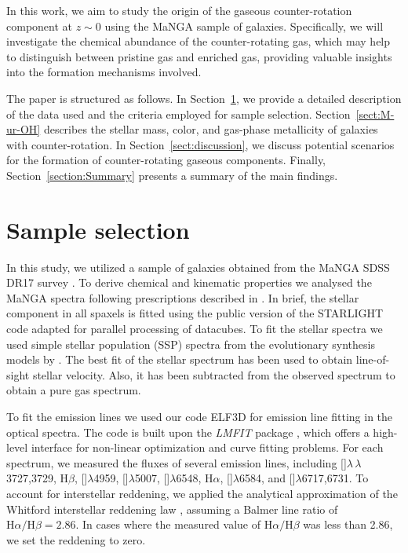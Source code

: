 \documentclass[12pt,preprint]{aa}
\begin{document}
In this work, we aim to study the origin of the gaseous counter-rotation component at $z \sim 0$ using the MaNGA sample of galaxies. Specifically, we will investigate the chemical abundance of the counter-rotating gas, which may help to distinguish between pristine gas and enriched gas, providing valuable insights into the formation mechanisms involved.

The paper is structured as follows. In Section~\ref{sect:data}, we provide a detailed description of the data used and the criteria employed for sample selection. Section~\ref{sect:M-ur-OH} describes the stellar mass, color, and gas-phase metallicity of galaxies with counter-rotation. In Section~\ref{sect:discussion}, we discuss potential scenarios for the formation of counter-rotating gaseous components. Finally, Section~\ref{section:Summary} presents a summary of the main findings.


\section{Sample selection}
\label{sect:data}

In this study, we utilized a sample of galaxies obtained from the MaNGA SDSS DR17 survey \citep{SDSSDR17}. To derive chemical and kinematic properties we analysed the MaNGA spectra following prescriptions described in \citet{Zinchenko2016,Zinchenko2021}.
In brief, the stellar component in all spaxels is fitted using the public version of the STARLIGHT code \citep{CidFernandes2005,Mateus2006,Asari2007}
adapted for parallel processing of datacubes.
To fit the stellar spectra we used simple stellar population (SSP) spectra from the evolutionary synthesis models by \citet{BC03}. The best fit of the stellar spectrum has been used to obtain line-of-sight stellar velocity. Also, it has been subtracted from the observed spectrum to obtain a pure gas spectrum. 

To fit the emission lines we used our code ELF3D for emission line fitting in the optical spectra. The code is built upon the \textit{LMFIT} package \citep{LMFIT2014}, which offers a high-level interface for non-linear optimization and curve fitting problems. For each spectrum, we measured the fluxes of several emission lines, including 
[]$\lambda\,\lambda$3727,3729,
H$\beta$,
[]$\lambda$4959,
[]$\lambda$5007,
[]$\lambda$6548,
H$\alpha$,
[]$\lambda$6584, and
[]$\lambda$6717,6731. To account for interstellar reddening, we applied the analytical approximation of the Whitford interstellar reddening law \citep{Izotov1994}, assuming a Balmer line ratio of $\text{H}\alpha/\text{H}\beta = 2.86$. In cases where the measured value of $\text{H}\alpha/\text{H}\beta$ was less than 2.86, we set the reddening to zero.
\end{document}
